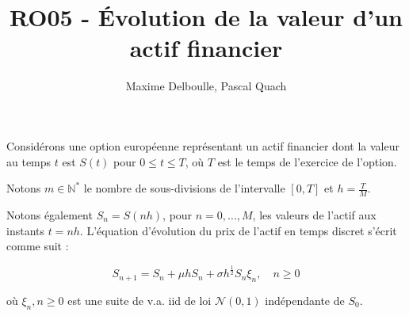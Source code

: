 \documentclass[answers, 10pt]{exam}
\begin{document}
\title{RO05 - \'Evolution de la valeur d'un actif financier}
\author{Maxime Delboulle, Pascal Quach}
\maketitle

Considérons une option européenne représentant un actif financier dont la
valeur au temps $t$ est $S(t)$ pour $0 \leq t \leq T$, où $T$ est le temps de
l’exercice de l’option. 

Notons $m\in \mathbb{N}^*$ le nombre de sous-divisions de l’intervalle $[0, T]$
et $h=\frac{T}{M}$.  

Notons également $S_n = S(nh)$, pour $n=0, \dots, M$, les valeurs de l’actif
aux instants $t= nh$.  L’équation d’évolution du prix de l’actif en temps
discret s’écrit comme suit :

\begin{equation}\label{eq:actif-financier}
	S_{n+1} = S_n + \mu h S_n + \sigma h^{ \frac{1}{2} } S_n \xi_n,\quad n \geq 0 
\end{equation}

où $\xi_n, n\geq 0$ est une suite de v.a. iid de loi $\mathcal{N}(0, 1)$
indépendante de $S_0$.
\end{document}
